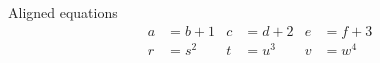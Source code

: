 \documentclass{article}
\begin{document}
Aligned equations
\begin{align*}
a &= b+1  & c &= d+2 & e &= f+3 \\
r &= s^{2} & t &= u^{3} & v &= w^{4}
\end{align*}
\end{document}

